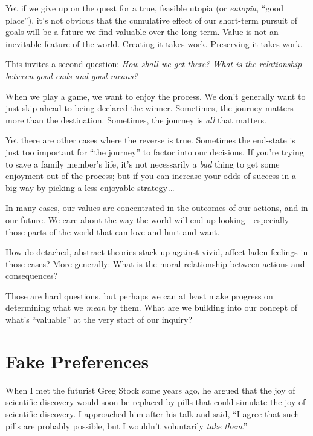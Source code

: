  Yet if we give up on the quest for a true, feasible utopia (or
\textit{eutopia}, ``good place''),
it's not obvious that the cumulative effect of our
short-term pursuit of goals will be a future we find valuable over the
long term. Value is not an inevitable feature of the world. Creating it
takes work. Preserving it takes work.

{
 This invites a second question: \textit{How shall we get there?
What is the relationship between good ends and good means?}}


 When we play a game, we want to enjoy the process. We
don't generally want to just skip ahead to being
declared the winner. Sometimes, the journey matters more than the
destination. Sometimes, the journey is \textit{all} that matters.


 Yet there are other cases where the reverse is true. Sometimes the
end-state is just too important for ``the
journey'' to factor into our decisions. If
you're trying to save a family member's
life, it's not necessarily a \textit{bad} thing to get
some enjoyment out of the process; but if you can increase your odds of
success in a big way by picking a less enjoyable strategy\,\ldots


 In many cases, our values are concentrated in the outcomes of our
actions, and in our future. We care about the way the world will end up
looking---especially those parts of the world that can love and hurt
and want.


 How do detached, abstract theories stack up against vivid,
affect-laden feelings in those cases? More generally: What is the moral
relationship between actions and consequences?


 Those are hard questions, but perhaps we can at least make
progress on determining what we \textit{mean} by them. What are we
building into our concept of what's
``valuable'' at the very start of
our inquiry?

\myendsectiontext

\chapter{Fake Preferences}



 When I met the futurist Greg Stock some years ago, he argued that
the joy of scientific discovery would soon be replaced by pills that
could simulate the joy of scientific discovery. I approached him after
his talk and said, ``I agree that such pills are
probably possible, but I wouldn't voluntarily
\textit{take them}.'' 


